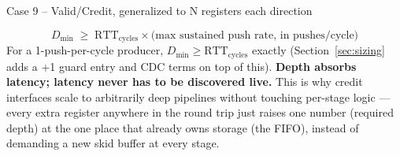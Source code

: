 \documentclass[12pt]{article}
\begin{document}
\begin{casebox}{Case 9 -- Valid/Credit, generalized to N registers each direction}
\begin{formulabox}
\[
  D_{\min} \;\geq\; \text{RTT}_{\text{cycles}} \times \text{(max sustained push rate, in pushes/cycle)}
\]
For a 1-push-per-cycle producer, $D_{\min} \geq \text{RTT}_{\text{cycles}}$
exactly (Section~\ref{sec:sizing} adds a +1 guard entry and CDC terms on
top of this). \textbf{Depth absorbs latency; latency never has to be
discovered live.} This is why credit interfaces scale to arbitrarily deep
pipelines without touching per-stage logic — every extra register anywhere
in the round trip just raises one number (required depth) at the one place
that already owns storage (the FIFO), instead of demanding a new skid
buffer at every stage.
\end{formulabox}
\end{casebox}
\end{document}
